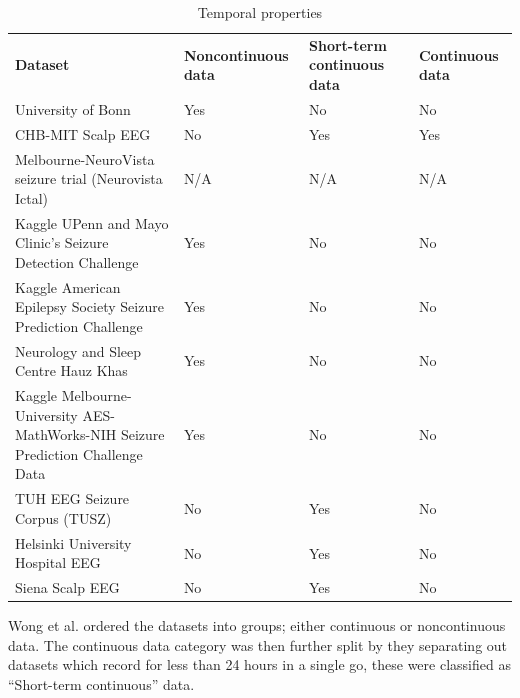 \documentclass[12pt]{article}
\begin{document}
\begin{table}[H]
\centering
\begin{tabular}{p{}p{}p{}p{}}
  \textbf{Dataset} &
  \textbf{Noncontinuous data} &
  \textbf{Short-term continuous data} &
  \textbf{Continuous data} \\
  
University of Bonn                                                              & Yes & No  & No  \\
CHB-MIT Scalp EEG                                                               & No  & Yes & Yes \\
Melbourne-NeuroVista seizure trial (Neurovista Ictal)                           & N/A & N/A & N/A \\
Kaggle UPenn and Mayo Clinic's Seizure Detection Challenge                      & Yes & No  & No  \\
Kaggle American Epilepsy Society Seizure Prediction Challenge                   & Yes & No  & No  \\
Neurology and Sleep Centre Hauz Khas                                            & Yes & No  & No  \\
Kaggle Melbourne-University AES-MathWorks-NIH Seizure Prediction Challenge Data & Yes & No  & No  \\
TUH EEG Seizure Corpus (TUSZ)                                                   & No  & Yes & No  \\
Helsinki University Hospital EEG                                                & No  & Yes & No  \\
Siena Scalp EEG                                                                 & No  & Yes & No 
\end{tabular}
\caption{Temporal properties}
\end{table}

Wong et al. ordered the datasets into groups; either continuous or noncontinuous data. The continuous data category was then further split by they separating out datasets which record for less than 24 hours in a single go, these were classified as ``Short-term continuous'' data.
\end{document}
